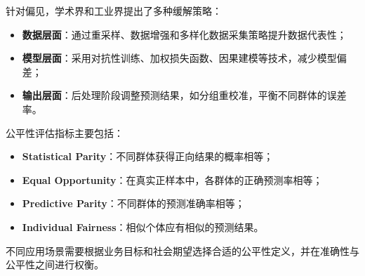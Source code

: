 
针对偏见，学术界和工业界提出了多种缓解策略：

\begin{itemize}
	\item \textbf{数据层面}：通过重采样、数据增强和多样化数据采集策略提升数据代表性；
	\item \textbf{模型层面}：采用对抗性训练、加权损失函数、因果建模等技术，减少模型偏差；
	\item \textbf{输出层面}：后处理阶段调整预测结果，如分组重校准，平衡不同群体的误差率。
\end{itemize}

公平性评估指标主要包括：

\begin{itemize}
	\item \textbf{Statistical Parity}：不同群体获得正向结果的概率相等；
	\item \textbf{Equal Opportunity}：在真实正样本中，各群体的正确预测率相等；
	\item \textbf{Predictive Parity}：不同群体的预测准确率相等；
	\item \textbf{Individual Fairness}：相似个体应有相似的预测结果。
\end{itemize}

不同应用场景需要根据业务目标和社会期望选择合适的公平性定义，并在准确性与公平性之间进行权衡。